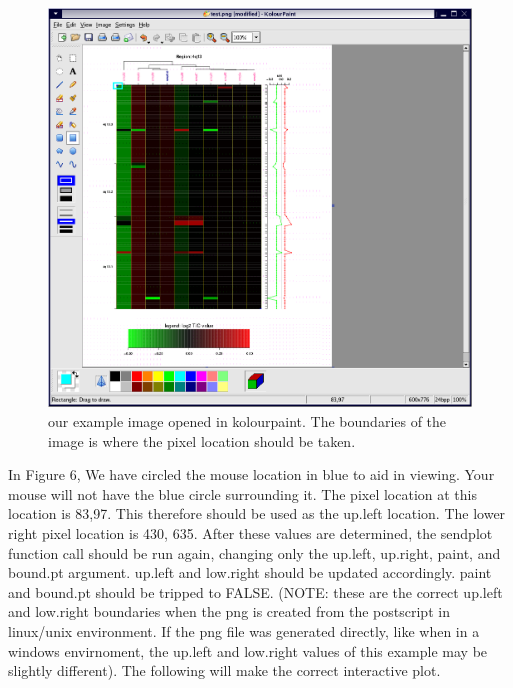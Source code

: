 \documentclass[]{article}
\begin{document}
\begin{center}
\begin{figure}
\includegraphics{sendPlot3}
\caption{our example image opened in kolourpaint. The boundaries of the image is where the pixel location should be taken.}
\end{figure}
\end{center}

\quad In Figure 6, We have circled the mouse location in blue to aid in viewing. Your mouse will not have the blue circle surrounding it. The pixel location at this location is 83,97. This therefore should be used as the up.left location. The lower right pixel location is 430, 635. After these values are determined, the sendplot function call should be run again, changing only the up.left, up.right, paint, and bound.pt argument. up.left and low.right should be updated accordingly. paint and bound.pt should be tripped to FALSE. (NOTE: these are the correct up.left and low.right boundaries when the png is created from the postscript in linux/unix environment. If the png file was generated directly, like when in a windows envirnoment, the up.left and low.right values of this example may be slightly different).  The following will make the correct interactive plot.
\end{document}
